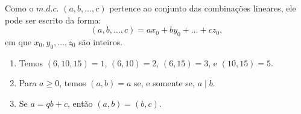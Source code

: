 Como o $m.d.c.$ $(a, b, \ldots, c)$ pertence ao conjunto das combinações lineares, 
ele pode ser escrito da forma:
\[
(a, b, \ldots, c) = ax_0 + by_0 + \ldots + cz_0,
\]
em que $x_0, y_0, \ldots, z_0$ são inteiros.

\begin{exemplo}
    \begin{enumerate}
        \item Temos $(6, 10, 15) = 1$, $(6, 10) = 2$, $(6, 15) = 3$, e $(10, 15) = 5$.
        \item Para $a \ge 0$, temos $(a, b) = a$ se, e somente se, $a \mid b$.
        \item Se $a = qb + c$, então $(a, b) = (b, c)$.
    \end{enumerate}
\end{exemplo}
